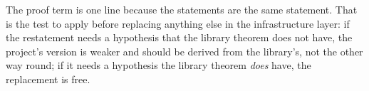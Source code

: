 The proof term is one line because the statements are the same statement. That is the test
to apply before replacing anything else in the infrastructure layer: if the restatement
needs a hypothesis that the library theorem does not have, the project's version is weaker
and should be derived from the library's, not the other way round; if it needs a hypothesis
the library theorem \emph{does} have, the replacement is free.
